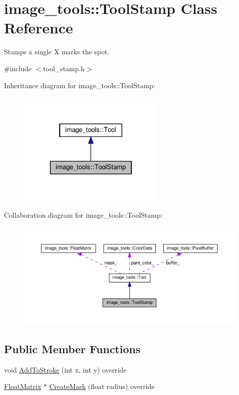 \hypertarget{classimage__tools_1_1ToolStamp}{}\section{image\+\_\+tools\+:\+:Tool\+Stamp Class Reference}
\label{classimage__tools_1_1ToolStamp}


Stamps a single X marks the spot.  




{\ttfamily \#include $<$tool\+\_\+stamp.\+h$>$}



Inheritance diagram for image\+\_\+tools\+:\+:Tool\+Stamp\+:
\nopagebreak
\begin{figure}[H]
\begin{center}
\leavevmode
\includegraphics[width=202pt]{classimage__tools_1_1ToolStamp__inherit__graph}
\end{center}
\end{figure}


Collaboration diagram for image\+\_\+tools\+:\+:Tool\+Stamp\+:
\nopagebreak
\begin{figure}[H]
\begin{center}
\leavevmode
\includegraphics[width=350pt]{classimage__tools_1_1ToolStamp__coll__graph}
\end{center}
\end{figure}
\subsection*{Public Member Functions}
\begin{DoxyCompactItemize}
\item 
void \hyperlink{classimage__tools_1_1ToolStamp_a098a342f03717e2f909cda9515c85814}{Add\+To\+Stroke} (int x, int y) override
\item 
\hyperlink{classimage__tools_1_1FloatMatrix}{Float\+Matrix} $\ast$ \hyperlink{classimage__tools_1_1ToolStamp_a1331846ac4bcfc7aa307cf966658d056}{Create\+Mask} (float radius) override
\end{DoxyCompactItemize}
